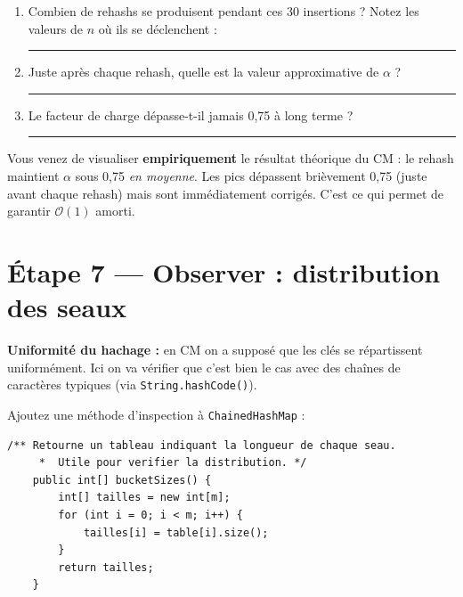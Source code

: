 \documentclass[11pt,a4paper]{article}
\newcommand{\bigO}{\mathcal{O}}
\begin{document}
\begin{exercicebox}
\begin{enumerate}[nosep]
    \item Combien de rehashs se produisent pendant ces 30 insertions ? Notez les valeurs de $n$ où ils se déclenchent : \rule{6cm}{0.4pt}
    \item Juste après chaque rehash, quelle est la valeur approximative de $\alpha$ ? \rule{4cm}{0.4pt}
    \item Le facteur de charge dépasse-t-il jamais 0,75 à long terme ? \rule{4cm}{0.4pt}
\end{enumerate}
\end{exercicebox}

\begin{infobox}
Vous venez de visualiser \textbf{empiriquement} le résultat théorique du CM : le rehash maintient $\alpha$ sous 0,75 \emph{en moyenne}. Les pics dépassent brièvement 0,75 (juste avant chaque rehash) mais sont immédiatement corrigés. C'est ce qui permet de garantir $\bigO(1)$ amorti.
\end{infobox}

\section{Étape 7 --- Observer : distribution des seaux}

\begin{lienbox}[Ce qu'on matérialise du CM]
\textbf{Uniformité du hachage :} en CM on a supposé que les clés se répartissent uniformément. Ici on va vérifier que c'est bien le cas avec des chaînes de caractères typiques (via \texttt{String.hashCode()}).
\end{lienbox}

Ajoutez une méthode d'inspection à \texttt{ChainedHashMap} :

\begin{lstlisting}[style=java]
    /** Retourne un tableau indiquant la longueur de chaque seau.
     *  Utile pour verifier la distribution. */
    public int[] bucketSizes() {
        int[] tailles = new int[m];
        for (int i = 0; i < m; i++) {
            tailles[i] = table[i].size();
        }
        return tailles;
    }
\end{lstlisting}
\end{document}
